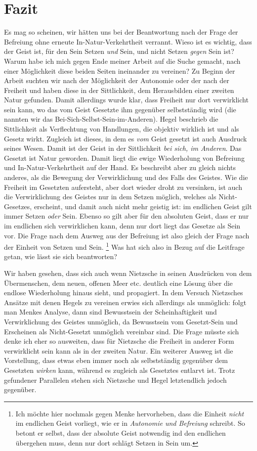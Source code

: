 \documentclass[12pt, a4paper, openany]{report}
\begin{document}
\chapter{Fazit}
Es mag so scheinen, wir hätten uns bei der Beantwortung nach der Frage der Befreiung ohne erneute In-Natur-Verkehrtheit verrannt.
Wieso ist es wichtig, dass der Geist  ist, für den Sein Setzen \emph{und} Sein, und nicht Setzen \emph{gegen} Sein ist?
Warum habe ich mich gegen Ende meiner Arbeit auf die Suche gemacht, nach einer Möglichkeit diese beiden Seiten ineinander zu vereinen? 
Zu Beginn der Arbeit suchten wir nach der Möglichkeit der Autonomie oder der nach der Freiheit und haben diese in der Sittlichkeit, dem Herausbilden einer zweiten Natur gefunden.
Damit allerdings wurde klar, dass Freiheit nur dort verwirklicht sein kann, wo das vom Geist Gesetzte ihm gegenüber selbstständig wird (die nannten wir das Bei-Sich-Selbst-Sein-im-Anderen).
Hegel beschrieb die Sittlichkeit als Verflechtung von Handlungen, die objektiv wirklich ist und als Gesetz wirkt. 
Zugleich ist dieses, in dem es \emph{vom} Geist gesetzt ist auch Ausdruck seines Wesen. 
Damit ist der Geist in der Sittlichkeit \emph{bei sich, im Anderen}.
Das Gesetzt ist Natur geworden.
Damit liegt die ewige Wiederholung von Befreiung und In-Natur-Verkehrtheit auf der Hand.
Es beschreibt aber zu gleich nichts anderes, als die Bewegung der Verwirklichung und des Falls des Geistes. 
Wie die Freiheit im Gesetzten aufersteht, aber dort wieder droht zu versinken, ist auch die Verwirklichung des Geistes nur in dem Setzen möglich, welches als Nicht-Gesetzes, erscheint, und damit auch nicht mehr geistig ist: 
im endlichen Geist gilt immer Setzen \emph{oder} Sein.
Ebenso so gilt aber für den absoluten Geist, dass er nur im endlichen sich verwirklichen kann, denn nur dort liegt das Gesetze als Sein vor.
Die Frage nach dem Ausweg aus der Befreiung ist also gleich der Frage nach der Einheit von Setzen und Sein.%
\footnote{
    Ich möchte hier nochmals gegen Menke hervorheben, dass die Einheit \emph{nicht} im endlichen Geist vorliegt, wie er in \emph{Autonomie und Befreiung} schreibt.
    So betont er selbst, dass der absolute Geist notwendig ind den endlichen übergehen muss, denn nur dort schlägt Setzen in Sein um.
}
Was hat sich also in Bezug auf die Leitfrage getan, wie lässt sie sich beantworten? 

Wir haben gesehen, dass sich auch wenn Nietzsche in seinen Ausdrücken von dem Übermenschen, dem neuen, offenen Meer etc. deutlich eine Lösung über die endlose Wiederholung hinaus sieht, und propagiert. 
In dem Versuch Nietzsches Ansätze mit denen Hegels zu vereinen erwies sich allerdings als unmöglich: 
folgt man Menkes Analyse, dann sind Bewusstsein der Scheinhaftigkeit und Verwirklichung des Geistes unmöglich, da Bewusstsein vom Gesetzt-Sein und Erscheinen als Nicht-Gesetzt unmöglich vereinbar sind. 
Die Frage müsste sich denke ich eher so ausweiten, dass für Nietzsche die Freiheit in anderer Form verwirklicht sein kann als in der zweiten Natur.
Ein weiterer Ausweg ist die Vorstellung, dass etwas eben immer noch als selbstständig gegenüber dem Gesetzten \emph{wirken} kann, während es zugleich als Gesetztes entlarvt ist.
Trotz gefundener Parallelen stehen sich Nietzsche und Hegel letztendlich jedoch gegenüber.


\backmatter

\printbibliography
\listoftodos
 
\end{document}
